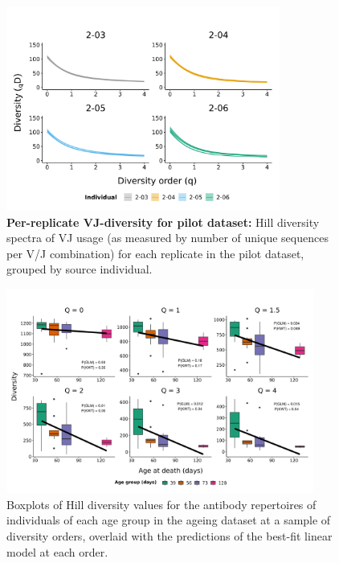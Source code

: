 \begin{figure}
\centering
\includegraphics[width = 0.8\textwidth]{_Figures/png/pilot-vj-diversity-solo-spectra}
\caption{\textbf{Per-replicate VJ-diversity for pilot dataset:} Hill diversity spectra of VJ usage (as measured by number of unique sequences per V/J combination) for each replicate in the \igseq pilot dataset, grouped by source individual.}
\label{fig:igseq-pilot-clone-diversity-vj-spectra}
\end{figure} %

\begin{figure}
\centering
\includegraphics[width = 0.9\textwidth]{_Figures/png/ageing-clone-diversity-solo-fit-linear}
\caption{Boxplots of Hill diversity values for the antibody repertoires of individuals of each age group in the \igseq ageing dataset at a sample of diversity orders, overlaid with the predictions of the best-fit linear model at each order.}
\label{fig:igseq-ageing-clone-diversity-solo-fit-linear}
\end{figure}

